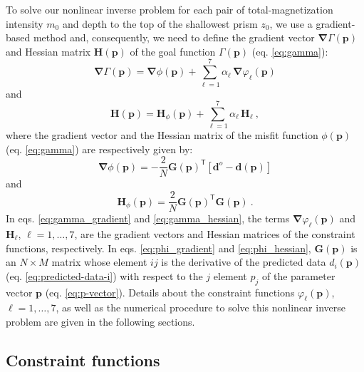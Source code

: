 To solve our nonlinear inverse problem for each pair of total-magnetization 
intensity $m_{0}$ and depth to the top of the shallowest prism $z_{0}$, 
we use a gradient-based method and, consequently, we need to define the gradient vector 
$\boldsymbol{\nabla}\Gamma(\mathbf{p})$ and Hessian matrix $\mathbf{H}(\mathbf{p})$ of 
the goal function $\Gamma(\mathbf{p})$ (eq. \ref{eq:gamma}):
\begin{equation}\label{eq:gamma_gradient}
\boldsymbol{\nabla}\Gamma (\mathbf{p}) = \boldsymbol{\nabla}\phi (\mathbf{p}) + 
\sum\limits^{7}_{\ell =1} \alpha_{\ell} \, \boldsymbol{\nabla}\varphi_{\ell}(\mathbf{p})
\end{equation}
and
\begin{equation}\label{eq:gamma_hessian}
\mathbf{H} (\mathbf{p}) = \mathbf{H}_\phi (\mathbf{p}) + \sum\limits^{7}_{\ell =1} \alpha_{\ell} \, \mathbf{H}_\ell \: ,
\end{equation}
where the gradient vector and the Hessian matrix of the misfit function 
$\phi(\mathbf{p})$ (eq. \ref{eq:gamma}) are respectively given by:
\begin{equation}\label{eq:phi_gradient}
\boldsymbol{\nabla} \phi(\mathbf{p}) =  - \frac{2}{N}\mathbf{G}(\mathbf{p})^{\mathsf{T}}[\mathbf{d}^o - \mathbf{d}(\mathbf{p})]
\end{equation} 
and 
\begin{equation}\label{eq:phi_hessian}
\mathbf{H}_{\phi}(\mathbf{p}) = \frac{2}{N}\mathbf{G}(\mathbf{p})^{\mathsf{T}}\mathbf{G}(\mathbf{p}) \: .
\end{equation}
In eqs. \ref{eq:gamma_gradient} and \ref{eq:gamma_hessian}, the terms 
$\boldsymbol{\nabla} \varphi_{\ell}(\mathbf{p})$ and $\mathbf{H}_{\ell}$, 
$\ell = 1, \dots, 7$, are the gradient vectors and Hessian matrices of the constraint functions, respectively. In eqs. \ref{eq:phi_gradient} and \ref{eq:phi_hessian},
$\mathbf{G}(\mathbf{p})$ is an $N \times M$ matrix whose element $ij$ is the derivative of the predicted data $d_{i}(\mathbf{p})$ (eq. \ref{eq:predicted-data-i}) with respect to the $j$ element $p_{j}$ of 
the parameter vector $\mathbf{p}$ (eq. \ref{eq:p-vector}). Details about the constraint functions $\varphi_\ell(\mathbf{p})$, $\ell = 1, \dots, 7$, as well as the numerical procedure to solve this nonlinear inverse problem are given in the following sections.

\subsection{Constraint functions}\label{sec:constraints}

